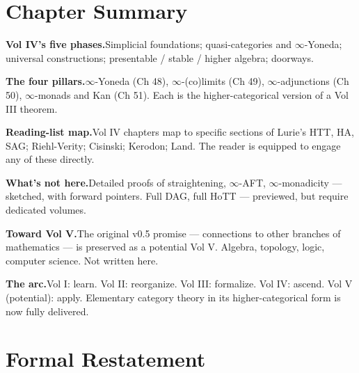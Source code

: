 \section*{Chapter Summary}

\begin{summarybox}
\textbf{Vol IV's five phases.}\quad Simplicial foundations; quasi-categories
and $\infty$-Yoneda; universal constructions; presentable / stable /
higher algebra; doorways.

\textbf{The four pillars.}\quad $\infty$-Yoneda (Ch 48), $\infty$-(co)limits
(Ch 49), $\infty$-adjunctions (Ch 50), $\infty$-monads and Kan (Ch 51).
Each is the higher-categorical version of a Vol III theorem.

\textbf{Reading-list map.}\quad Vol IV chapters map to specific sections
of Lurie's HTT, HA, SAG; Riehl-Verity; Cisinski; Kerodon; Land. The
reader is equipped to engage any of these directly.

\textbf{What's not here.}\quad Detailed proofs of straightening, $\infty$-AFT,
$\infty$-monadicity — sketched, with forward pointers. Full DAG, full HoTT
— previewed, but require dedicated volumes.

\textbf{Toward Vol V.}\quad The original v0.5 promise — connections to
other branches of mathematics — is preserved as a potential Vol V.
Algebra, topology, logic, computer science. Not written here.

\textbf{The arc.}\quad Vol I: learn. Vol II: reorganize. Vol III: formalize.
Vol IV: ascend. Vol V (potential): apply. Elementary category theory in
its higher-categorical form is now fully delivered.
\end{summarybox}


\section*{Formal Restatement}


